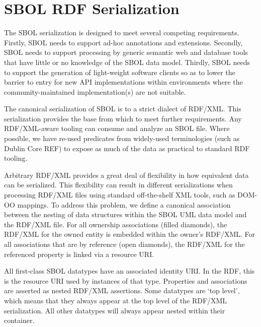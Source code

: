 \section{SBOL RDF Serialization}


The SBOL serialization is designed to meet several competing requirements. Firstly, SBOL needs to support ad-hoc annotations and extensions. Secondly, SBOL needs to support processing by generic semantic web and database tools that have little or no knowledge of the SBOL data model. Thirdly, SBOL needs to support the generation of light-weight software clients so as to lower the barrier to entry for new API implementations within environments where the community-maintained implementation(s) are not suitable.

The canonical serialization of SBOL is to a strict dialect of RDF/XML. This serialization provides the base from which to meet further requirements. Any RDF/XML-aware tooling can consume and analyze an SBOL file. Where possible, we have re-used predicates from widely-used terminologies (such as Dublin Core REF) to expose as much of the data as practical to standard RDF tooling.

Arbitrary RDF/XML provides a great deal of flexibility in how equivalent data can be serialized. This flexibility can result in different serializations when processing RDF/XML files using standard off-the-shelf XML tools, such as DOM-OO mappings. To address this problem, we define a canonical association between the nesting of data structures within the SBOL UML data model and the RDF/XML file. For all ownership associations (filled diamonds), the RDF/XML for the owned entity is embedded within the owner's RDF/XML. For all associations that are by reference (open diamonds), the RDF/XML for the referenced property is linked via a resource URI.

All first-class SBOL datatypes have an associated identity URI. In the RDF, this is the resource URI used by instances of that type. Properties and associations are asserted as nested RDF/XML assertions. Some datatypes are `top level', which means that they always appear at the top level of the RDF/XML serialization. All other datatypes will always appear nested within their container.

